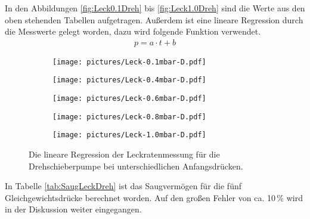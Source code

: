 In den Abbildungen \eqref{fig:Leck0.1Dreh} bis \eqref{fig:Leck1.0Dreh} sind die Werte aus den oben stehenden Tabellen aufgetragen. Außerdem ist eine lineare Regression durch die Messwerte gelegt worden, dazu wird folgende Funktion verwendet.
\begin{align}
  p = a \cdot t + b
\end{align}

\begin{figure}[H]
  \begin{subfigure}[c]{0.49\textwidth}
    \texttt{[image: pictures/Leck-0.1mbar-D.pdf]}
    \label{fig:Leck0.1Dreh}
  \end{subfigure}\hfill
  \begin{subfigure}[c]{0.49\textwidth}
    \texttt{[image: pictures/Leck-0.4mbar-D.pdf]}
    \label{fig:Leck0.4Dreh}
  \end{subfigure}

  \begin{subfigure}[c]{0.49\textwidth}
    \texttt{[image: pictures/Leck-0.6mbar-D.pdf]}
    \label{fig:Leck0.6Dreh}
  \end{subfigure}\hfill
  \begin{subfigure}[c]{0.49\textwidth}
    \texttt{[image: pictures/Leck-0.8mbar-D.pdf]}
    \label{fig:Leck0.8Dreh}
  \end{subfigure}

  \begin{subfigure}[c]{0.49\textwidth}
    \texttt{[image: pictures/Leck-1.0mbar-D.pdf]}
    \label{fig:Leck1.0Dreh}
  \end{subfigure}
  \caption{Die lineare Regression der Leckratenmessung für die Drehschieberpumpe bei unterschiedlichen Anfangsdrücken.}
\end{figure}

In Tabelle \eqref{tab:SaugLeckDreh} ist das Saugvermögen für die fünf Gleichgewichtsdrücke berechnet worden. Auf den großen Fehler von ca. 10\,\% wird in der Diskussion weiter eingegangen.

